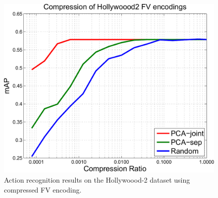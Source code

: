 \documentclass[10pt,twocolumn,letterpaper]{article}
\begin{document}
\begin{figure}
\begin{center}
\includegraphics[width=.8\linewidth]{figures/compression/compression-hwd2-FV-sum96-all-cropped.pdf}
\caption{Action recognition results on the Hollywoood-2 dataset using compressed FV encoding.\vspace{-.5cm}}
\label{fig:dimred}
\end{center}
\end{figure}








%
%
%
\end{document}

